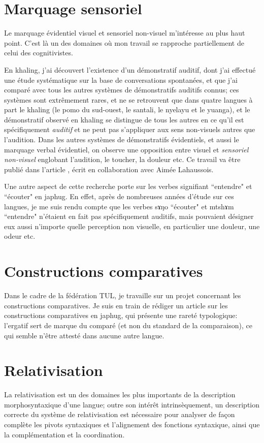 \documentclass[oldfontcommands,oneside,a4paper,11pt]{memoir}
\newcommand{\ipa}[1]{{\phon #1}} %
\begin{document}
\section{Marquage sensoriel}
Le marquage évidentiel visuel et sensoriel non-visuel m'intéresse au plus haut point. C'est là un des domaines où mon travail se rapproche partiellement de celui des cognitivistes.

En khaling, j'ai découvert l'existence d'un démonstratif auditif, dont j'ai effectué une étude systématique sur la base de conversations spontanées, et que j'ai comparé avec tous les autres systèmes de démonstratifs auditifs connus; ces systèmes sont extrêmement rares, et ne se retrouvent que dans quatre langues à part le khaling (le pomo du sud-ouest, le santali, le nyelayu et le yuanga), et le démonstratif observé en khaling se distingue de tous les autres en ce qu'il est spécifiquement \textit{auditif} et ne peut pas s'appliquer aux sens non-visuels autres que l'audition. Dans les autres systèmes de démonstratifs évidentiels, et aussi le marquage verbal évidentiel, on observe une opposition entre visuel et \textit{sensoriel non-visuel} englobant l'audition, le toucher, la douleur etc.
Ce travail va être publié dans l'article \citet{jacques14auditory}, écrit en collaboration avec Aimée Lahaussois.

Une autre aspect de cette recherche porte sur les verbes signifiant ``entendre" et ``écouter" en japhug. En effet, après de nombreuses années d'étude sur ces langues, je me suis rendu compte que les verbes \ipa{sɤŋo} ``écouter" et \ipa{mtshɤm} ``entendre" n'étaient en fait pas spécifiquement auditifs, mais pouvaient désigner eux aussi n'importe quelle perception non visuelle, en particulier une douleur, une odeur etc.


\section{Constructions comparatives}
Dans le cadre de la fédération TUL, je travaille sur un projet concernant les constructions comparatives. Je suis en train de rédiger un article sur les constructions comparatives en japhug, qui présente une rareté typologique: l'ergatif sert de marque du comparé (et non du standard de la comparaison), ce qui semble n'être attesté dans aucune autre langue. 

\section{Relativisation}
La relativisation est un des domaines les plus importants de la description morphosyntaxique d'une langue; outre son intérêt intrinsèquement, un description correcte du système de  relativisation est nécessaire pour analyser de façon complète les pivots syntaxiques et l'alignement des fonctions syntaxique, ainsi que la complémentation et la coordination.
\end{document}
